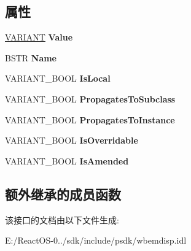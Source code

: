 \subsection*{属性}
\begin{DoxyCompactItemize}
\item 
\mbox{\label{interface_wbem_scripting_1_1_i_s_wbem_qualifier_a018d2350963c1d82e4cd7b942b65c647}} 
\hyperlink{structtag_v_a_r_i_a_n_t}{V\+A\+R\+I\+A\+NT} {\bfseries Value}
\item 
\mbox{\label{interface_wbem_scripting_1_1_i_s_wbem_qualifier_ac75475eb9fd970c900da18c44740be0a}} 
B\+S\+TR {\bfseries Name}
\item 
\mbox{\label{interface_wbem_scripting_1_1_i_s_wbem_qualifier_a6fcb9ae891cbcec1e3814b770e5f9c24}} 
V\+A\+R\+I\+A\+N\+T\+\_\+\+B\+O\+OL {\bfseries Is\+Local}
\item 
\mbox{\label{interface_wbem_scripting_1_1_i_s_wbem_qualifier_aaed886044943a9614772dd5fe8c231b3}} 
V\+A\+R\+I\+A\+N\+T\+\_\+\+B\+O\+OL {\bfseries Propagates\+To\+Subclass}
\item 
\mbox{\label{interface_wbem_scripting_1_1_i_s_wbem_qualifier_a75477abf98d11016ec93c730acca3995}} 
V\+A\+R\+I\+A\+N\+T\+\_\+\+B\+O\+OL {\bfseries Propagates\+To\+Instance}
\item 
\mbox{\label{interface_wbem_scripting_1_1_i_s_wbem_qualifier_a780059fba042288b6c9fb6a671477cce}} 
V\+A\+R\+I\+A\+N\+T\+\_\+\+B\+O\+OL {\bfseries Is\+Overridable}
\item 
\mbox{\label{interface_wbem_scripting_1_1_i_s_wbem_qualifier_a50a2cf9b8395a706718eb894d6e54148}} 
V\+A\+R\+I\+A\+N\+T\+\_\+\+B\+O\+OL {\bfseries Is\+Amended}
\end{DoxyCompactItemize}
\subsection*{额外继承的成员函数}


该接口的文档由以下文件生成\+:\begin{DoxyCompactItemize}
\item 
E\+:/\+React\+O\+S-\/0../sdk/include/psdk/wbemdisp.\+idl\end{DoxyCompactItemize}
